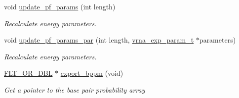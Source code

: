 \begin{DoxyCompactItemize}
void \hyperlink{group__pf__fold_ga384e927890f9c034ff09fa66da102d28}{update\+\_\+pf\+\_\+params} (int length)
\begin{DoxyCompactList}\small\item\em Recalculate energy parameters. \end{DoxyCompactList}\item 
void \hyperlink{group__pf__fold_gaafe2d1b21f5418b123b088aa395e827d}{update\+\_\+pf\+\_\+params\+\_\+par} (int length, \hyperlink{group__energy__parameters_ga01d8b92fe734df8d79a6169482c7d8d8}{vrna\+\_\+exp\+\_\+param\+\_\+t} $\ast$parameters)
\begin{DoxyCompactList}\small\item\em Recalculate energy parameters. \end{DoxyCompactList}\item 
\hyperlink{group__data__structures_ga31125aeace516926bf7f251f759b6126}{F\+L\+T\+\_\+\+O\+R\+\_\+\+D\+BL} $\ast$ \hyperlink{group__pf__fold_gac5ac7ee281aae1c5cc5898a841178073}{export\+\_\+bppm} (void)
\begin{DoxyCompactList}\small\item\em Get a pointer to the base pair probability array


\end{DoxyCompactList}
\end{DoxyCompactItemize}
